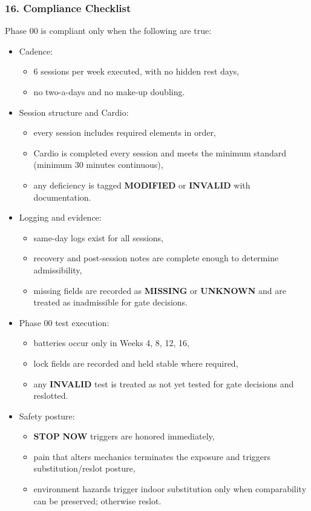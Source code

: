 \documentclass[10pt]{article}
\begin{document}
\subsubsection*{16. Compliance Checklist}

Phase 00 is compliant only when the following are true:

\begin{itemize}
\item Cadence:
  \begin{itemize}
  \item 6 sessions per week executed, with no hidden rest days,
  \item no two-a-days and no make-up doubling.
  \end{itemize}

\item Session structure and Cardio:
  \begin{itemize}
  \item every session includes required elements in order,
  \item Cardio is completed every session and meets the minimum standard (minimum 30 minutes continuous),
  \item any deficiency is tagged \textbf{MODIFIED} or \textbf{INVALID} with documentation.
  \end{itemize}

\item Logging and evidence:
  \begin{itemize}
  \item same-day logs exist for all sessions,
  \item recovery and post-session notes are complete enough to determine admissibility,
  \item missing fields are recorded as \textbf{MISSING} or \textbf{UNKNOWN} and are treated as inadmissible for gate decisions.
  \end{itemize}

\item Phase 00 test execution:
  \begin{itemize}
  \item batteries occur only in Weeks 4, 8, 12, 16,
  \item lock fields are recorded and held stable where required,
  \item any \textbf{INVALID} test is treated as not yet tested for gate decisions and reslotted.
  \end{itemize}

\item Safety posture:
  \begin{itemize}
  \item \textbf{STOP} \textbf{NOW} triggers are honored immediately,
  \item pain that alters mechanics terminates the exposure and triggers substitution/reslot posture,
  \item environment hazards trigger indoor substitution only when comparability can be preserved; otherwise reslot.
  \end{itemize}


\end{itemize}
\end{document}
